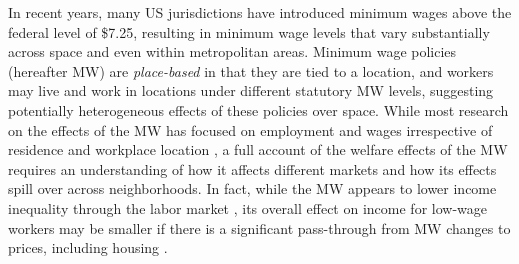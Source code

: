 

In recent years, many US jurisdictions have introduced minimum wages above the 
federal level of \$7.25, resulting in minimum wage levels that vary 
substantially across space and even within metropolitan areas.
Minimum wage policies (hereafter MW) are \textit{place-based} in that they are 
tied to a location, and workers may live and work in locations under different 
statutory MW levels, suggesting potentially heterogeneous effects of these 
policies over space.
While most research on the effects of the MW has focused on employment and 
wages irrespective of residence and workplace location
\parencite[e.g.,][]{CardKrueger1994, CegnizEtAl2019},
a full account of the welfare effects of the MW requires an understanding of 
how it affects different markets and how its effects spill over across 
neighborhoods.
In fact, while the MW appears to lower income inequality through the labor 
market \parencite{Lee1999, AutorEtAl2016},
its overall effect on income for low-wage workers may be smaller if there is 
a significant pass-through from MW changes to prices, including housing
\parencite{Macurdy2015}.

